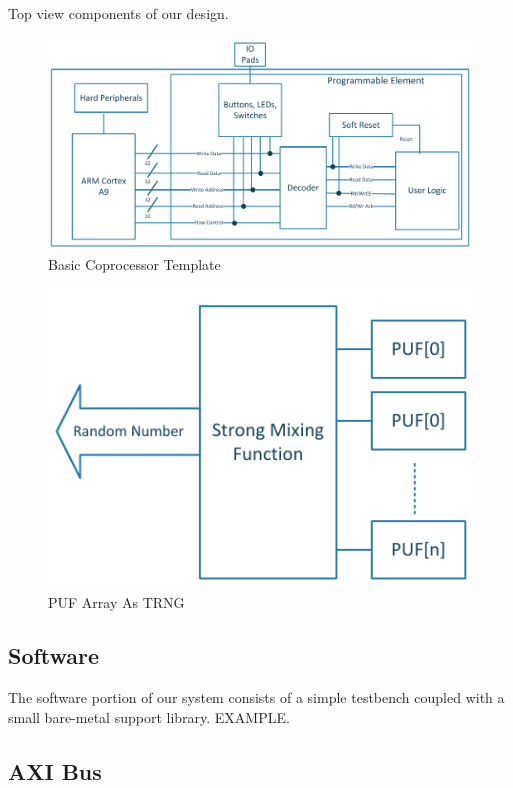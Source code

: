 \documentclass[journal]{IEEEtran}
\begin{document}
Top view components of our design.

\begin{figure}[!th]
\centering
\includegraphics[scale=.35]{Images/coprocessor-template.pdf}
\caption{ Basic Coprocessor Template}
\label{fig:template}
\end{figure} 


\begin{figure}[!th]
\centering
\includegraphics[scale=.75]{Images/trng.pdf}
\caption{PUF Array As TRNG }
\label{fig:trng}
\end{figure} 



\subsection{Software}

The software portion of our system consists of a simple testbench coupled with a small bare-metal support library. EXAMPLE.

\subsection{AXI Bus}
\end{document}
